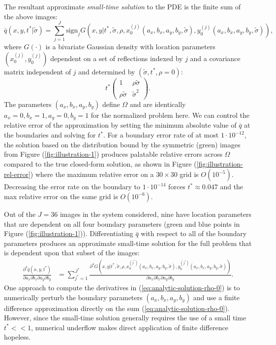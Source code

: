 \documentclass[10pt]{article}
\begin{document}
The resultant approximate \textit{small-time solution} to the PDE is
the finite sum of the above images:
\begin{equation}
  \bar{q}(x, y, t^{*}|\tilde{\sigma}) = \sum_{j=1}^J \mbox{sign}_j
  G(x,y|t^*, \tilde{\sigma}, \rho, x_0^{(j)}(a_x, b_x, a_y, b_y, \tilde{\sigma}),
  y_0^{(j)}(a_x, b_x, a_y, b_y, \tilde{\sigma})), \label{eq:small-time-sol}
\end{equation}
where $G(\cdot)$ is a bivariate Gaussian density with location
parameters $(x^{(j)}_0,y^{(j)}_0)$ dependent on a set of reflections indexed by $j$ and a
covariance matrix independent of $j$ and determined by
$(\tilde{\sigma}, t^*, \rho = 0)$:
\[
  t^{*} \left( \begin{array}{cc}
                 1 & \rho\tilde{\sigma} \\
                 \rho\tilde{\sigma} & \tilde{\sigma}^2
               \end{array} \right).
\]
The parameters $(a_x,b_x,a_y,b_y)$ define $\Omega$ and are identically
$a_x =0, b_x=1, a_y=0,b_y=1$ for the normalized problem here. We can
control the relative error of the approximation by setting the minimum
absolute value of $\bar{q}$ at the boundaries and solving for
$t^{*}$. For a boundary error rate of at most $1 \cdot 10^{-12}$, the
solution based on the distribution bound by the symmetric (green)
images from Figure (\ref{fig:illustration-1}) produces palatable
relative errors across $\Omega$ compared to the true closed-form
solution, as shown in Figure (\ref{fig:illustration-rel-error}) where
the maximum relative error on a $30 \times 30$ grid is $O(10^{-5})$.
Decreasing the error rate on the boundary to $1 \cdot 10^{-14}$ forces
$t^* \approx 0.047$ and the max relative error on the same grid is
$O(10^{-6})$.

Out of the $J=36$ images in the system considered, nine have location
parameters that are dependent on all four boundary parameters (green
and blue points in Figure (\ref{fig:illustration-1})). Differentiating
$\bar{q}$ with respect to all of the boundary parameters produces an
approximate small-time solution for the full problem that is dependent
upon that subset of the images:
\begin{align}
  \frac{\partial^4 \bar{q}(x, y, t^{*})}{\partial a_x
  \partial b_x \partial a_y \partial b_y} &= \sum_{j^*=1}^{J^*} \frac{\partial^4
                                            G(x,y|t^{*}, \tilde{\sigma}, \rho, x_0^{(j^*)}(a_x, b_x, a_y, b_y, \tilde{\sigma}),
                                            y_0^{(j^*)}(a_x, b_x, a_y, b_y, \tilde{\sigma}))} {\partial a_x \partial b_x
                                            \partial a_y \partial b_y}. \label{eq:analytic-solution-rho-0}
\end{align}
One approach to compute the derivatives in
(\ref{eq:analytic-solution-rho-0}) is to numerically perturb the
boundary parameters $(a_x,b_x,a_y,b_y)$ and use a finite difference
approximation directly on the sum
(\ref{eq:analytic-solution-rho-0}). However, since the small-time
solution generally requires the use of a small time $t^* << 1$,
numerical underflow makes direct application of finite difference
hopeless.
\end{document}
